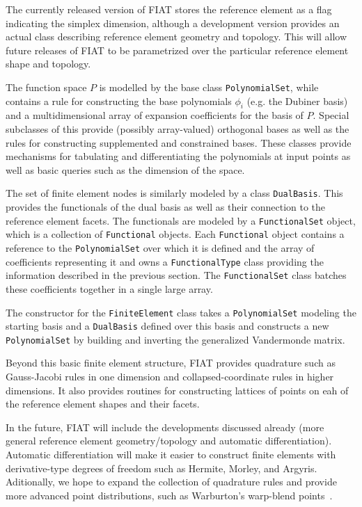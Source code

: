 The currently released version of FIAT stores the
reference element as a flag indicating the simplex dimension, although
a development version provides an actual class describing reference
element geometry and topology.  This will allow future releases of
FIAT to be parametrized over the particular reference element shape
and topology.

The function space \( P \) is modelled by the base class
\texttt{PolynomialSet}, while  contains a rule for
constructing the base polynomials \( \phi_i \) (e.g. the Dubiner
basis) and a multidimensional
array of expansion coefficients for the basis of \( P \).  Special
subclasses of this provide (possibly array-valued) orthogonal bases as
well as the rules for constructing supplemented and constrained
bases.  These classes provide mechanisms for tabulating and
differentiating the polynomials at input points as well as basic
queries such as the dimension of the space.

The set of finite element nodes is similarly modeled by a class
\texttt{DualBasis}.  This provides the functionals of the dual basis
as well as their connection to the reference element facets.
The functionals are modeled by a \texttt{FunctionalSet} object, which
is a collection of \texttt{Functional} objects.
Each \texttt{Functional} object contains a
reference to the \texttt{PolynomialSet} over which it is defined and
the array of coefficients representing it and owns a
\texttt{FunctionalType} class providing the information described in
the previous section.  The
\texttt{FunctionalSet} class batches these coefficients together in a
single large array.

The constructor for the \texttt{FiniteElement} class takes a
\texttt{PolynomialSet} modeling the starting basis and a
\texttt{DualBasis} defined over this basis and constructs a new
\texttt{PolynomialSet} by building and inverting the generalized
Vandermonde matrix.

Beyond this basic finite element structure, FIAT provides quadrature
such as Gauss-Jacobi rules in one dimension and
collapsed-coordinate rules in higher dimensions.  It also provides
routines for constructing lattices of points on eah of the reference
element shapes and their facets.

In the future, FIAT will include the developments discussed already
(more general reference element geometry/topology and automatic
differentiation).  Automatic differentiation will make it easier to
construct finite elements with deriva\-tive-type degrees of freedom such
as Hermite, Morley, and Argyris.  Aditionally,
we hope to expand the collection of quadrature
rules and provide more advanced point distributions, such as
Warburton's warp-blend points~\cite{War05}.

